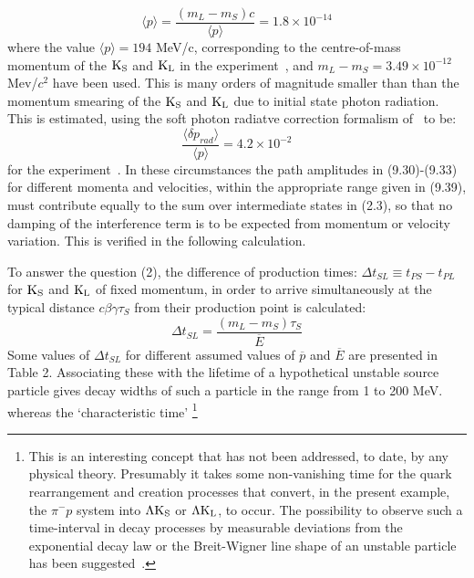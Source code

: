 {\begin{equation}
     {\langle p \rangle} = \frac{(m_L -m_S)c}{\langle p \rangle} = 1.8 \times 10^{-14}
   \end{equation} 
    where the value $\langle p \rangle = 194$ MeV/c, corresponding to the centre-of-mass momentum 
   of the  ${\rm K_S}$ and ${\rm K_L}$ in the experiment~\cite{DSDQ},
    and $m_L-m_S = 3.49 \times 10^{-12}$ Mev/$c^2$ have been used.
       This is many orders of magnitude smaller than than the momentum smearing of the
     ${\rm K_S}$ and ${\rm K_L}$  due to initial state photon radiation. This is estimated, using the 
    soft photon radiatve correction formalism of~\cite{RK} to be:
   \begin{equation}
     \frac{\langle \delta p_{rad} \rangle}{\langle p \rangle} = 4.2 \times 10^{-2}
   \end{equation}
    for the experiment~\cite{DSDQ}.
    In these circumstances the path amplitudes in (9.30)-(9.33) for different momenta and velocities,
   within the appropriate range given in (9.39), must contribute equally to the 
    sum over intermediate states in (2.3), so that no damping of
   the interference term is to be expected from momentum or velocity variation. This is verified in the following
   calculation.
    \par To answer the question (2), the difference
    of production times: $\Delta t_{SL} \equiv t_{PS}- t_{PL}$  for ${\rm K_S}$ and ${\rm K_L}$ of fixed momentum,
     in order to arrive simultaneously at the typical distance $c \beta \gamma \tau_S$ from their production point is calculated:
     \begin{equation}
      \Delta t_{SL} = \frac{(m_L-m_S) \tau_S}{\overline{E}}
    \end{equation} 
     Some values of $\Delta t_{SL}$ for different assumed values of $\overline{p} $ and $\overline{E}$ are 
    presented in Table 2. Associating these with the lifetime of a hypothetical unstable source particle
    gives decay widths of such a particle in the range from 1 to 200 MeV. whereas the `characteristic time'
    \footnote{This is an interesting concept that has not been addressed, to date, by any physical theory.
     Presumably it takes some non-vanishing time for the quark rearrangement and creation processes
     that convert, in the present example, the $\pi^-p$ system into $\Lambda{\rm K_S}$ or  $\Lambda{\rm K_L}$,
     to occur. The possibility to observe such a time-interval in decay processes by measurable deviations from
    the exponential decay law or the Breit-Wigner line shape of an unstable particle has been suggested~\cite{DLR}.} 
}
